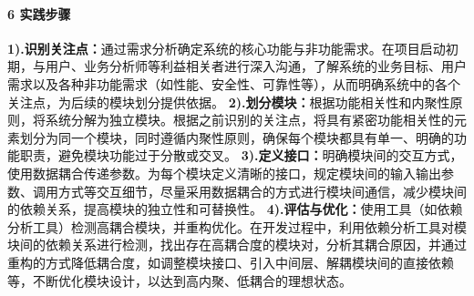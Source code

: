 \paragraph{6 实践步骤}\label{ux5b9eux8df5ux6b65ux9aa4}
\textbf{1).识别关注点：}通过需求分析确定系统的核心功能与非功能需求。在项目启动初期，与用户、业务分析师等利益相关者进行深入沟通，了解系统的业务目标、用户需求以及各种非功能需求（如性能、安全性、可靠性等），从而明确系统中的各个关注点，为后续的模块划分提供依据。
\textbf{2).划分模块：}根据功能相关性和内聚性原则，将系统分解为独立模块。根据之前识别的关注点，将具有紧密功能相关性的元素划分为同一个模块，同时遵循内聚性原则，确保每个模块都具有单一、明确的功能职责，避免模块功能过于分散或交叉。
\textbf{3).定义接口：}明确模块间的交互方式，使用数据耦合传递参数。为每个模块定义清晰的接口，规定模块间的输入输出参数、调用方式等交互细节，尽量采用数据耦合的方式进行模块间通信，减少模块间的依赖关系，提高模块的独立性和可替换性。
\textbf{4).评估与优化：}使用工具（如依赖分析工具）检测高耦合模块，并重构优化。在开发过程中，利用依赖分析工具对模块间的依赖关系进行检测，找出存在高耦合度的模块对，分析其耦合原因，并通过重构的方式降低耦合度，如调整模块接口、引入中间层、解耦模块间的直接依赖等，不断优化模块设计，以达到高内聚、低耦合的理想状态。
